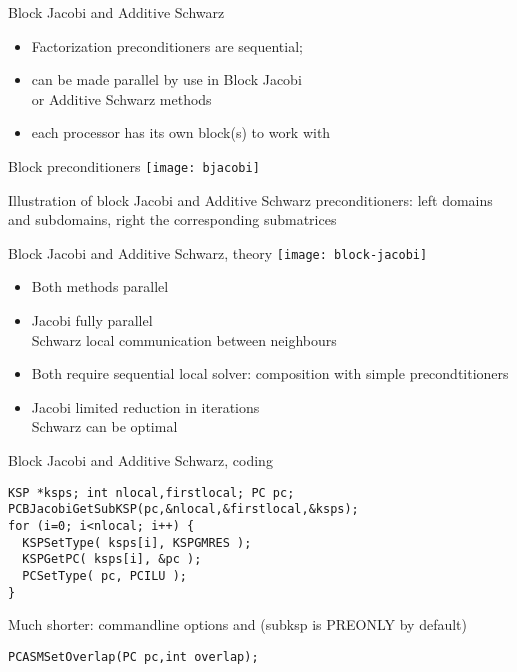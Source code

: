 \begin{higher}
\begin{numberedframe}{Block Jacobi and Additive Schwarz}
  \begin{itemize}
  \item Factorization preconditioners are sequential;
  \item can be made parallel by use in Block Jacobi\\
    or Additive Schwarz methods
  \item each processor has its own block(s) to work with
  \end{itemize}
\end{numberedframe}

\begin{numberedframe}{Block preconditioners}
  \texttt{[image: bjacobi]}

  Illustration of block Jacobi and Additive Schwarz preconditioners:
  left domains and subdomains, right the corresponding submatrices
\end{numberedframe}

\end{higher}

\begin{numberedframe}{Block Jacobi and Additive Schwarz, theory}
  \texttt{[image: block-jacobi]}
  \begin{itemize}
  \item Both methods parallel
  \item Jacobi fully parallel\\ Schwarz local communication between neighbours
  \item Both require sequential local solver: composition with simple
    precondtitioners
  \item Jacobi limited reduction in iterations\\ Schwarz can be optimal
  \end{itemize}
\end{numberedframe}

\begin{numberedframe}{Block Jacobi and Additive Schwarz, coding}

\begin{lstlisting}
KSP *ksps; int nlocal,firstlocal; PC pc;
PCBJacobiGetSubKSP(pc,&nlocal,&firstlocal,&ksps);
for (i=0; i<nlocal; i++) {
  KSPSetType( ksps[i], KSPGMRES );
  KSPGetPC( ksps[i], &pc );
  PCSetType( pc, PCILU );
}
\end{lstlisting}

Much shorter: commandline options  and 
(subksp is PREONLY  by default)

\begin{lstlisting}
PCASMSetOverlap(PC pc,int overlap);
\end{lstlisting}
\end{numberedframe}


